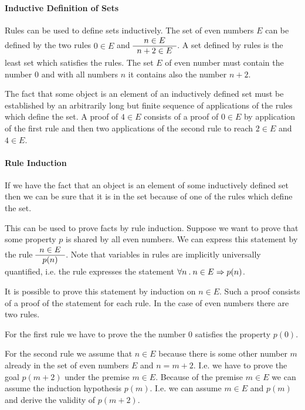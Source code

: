 \paragraph{Inductive Definition of Sets}

Rules can be used to define sets inductively. The set of even numbers $E$ can be
defined by the two rules $0 \in E$ and $\begin{array}{c} n \in E \\ \hline n+2 \in E\end{array}$. A set
defined by rules is the least set which satisfies the rules. The set $E$ of
even number must contain the number $0$ and with all numbers $n$ it contains
also the number $n+2$.

The fact that some object is an element of an inductively defined set must be
established by an arbitrarily long but finite sequence of applications of the
rules which define the set. A proof of $4 \in E$ consists of a proof of $0 \in
E$ by application of the first rule and then two applications of the second
rule to reach $2 \in E$ and $4 \in E$.






\paragraph{Rule Induction}

If we have the fact that an object is an element of some inductively defined
set then we can be sure that it is in the set because of one of the rules
which define the set.

This can be used to prove facts by rule induction. Suppose we want to prove
that some property $p$ is shared by all even numbers. We can express this
statement by the rule $\begin{array}{c} n \in E \\ \hline p(n)\end{array}$. Note that variables in rules
are implicitly universally quantified, i.e. the rule expresses the statement
$\forall n \mathbin. n \in E \Rightarrow p(n)$.

It is possible to prove this statement by induction on $n \in E$. Such a proof
consists of a proof of the statement for each rule. In the case of even
numbers there are two rules.

For the first rule we have to prove the the number $0$ satisfies the property
$p(0)$.

For the second rule we assume that $n \in E$ because there is some other
number $m$ already in the set of even numbers $E$ and $n = m+2$. I.e. we have
to prove the goal $p(m+2)$ under the premise $m \in E$. Because of the premise
$m \in E$ we can assume the induction hypothesis $p(m)$. I.e. we can assume
$m \in E$ and $p(m)$ and derive the validity of $p(m+2)$.

